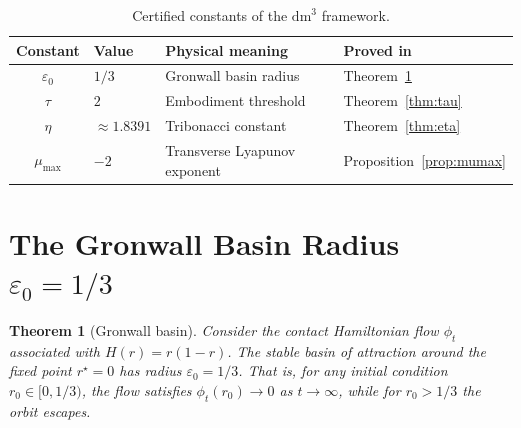 \documentclass[11pt,a4paper,openright]{book}
\theoremstyle{dm3thm}
\newtheorem{theorem}{Theorem}[chapter]
\theoremstyle{dm3def}
\newcommand{\dm}{\mathrm{dm}^3}
\newcommand{\eps}{\varepsilon_0}
\newcommand{\etaT}{\eta}   %
\newcommand{\mumax}{\mu_{\max}}
\begin{document}
\begin{table}[h]
\centering
\caption{Certified constants of the $\dm$ framework.}
\label{tab:constants}
\begin{tabular}{clll}
\toprule
Constant & Value & Physical meaning & Proved in \\
\midrule
$\eps$ & $1/3$ & Gronwall basin radius & Theorem~\ref{thm:eps}\\
$\tau$ & $2$ & Embodiment threshold & Theorem~\ref{thm:tau}\\
$\etaT$ & $\approx 1.8391$ & Tribonacci constant & Theorem~\ref{thm:eta}\\
$\mumax$ & $-2$ & Transverse Lyapunov exponent & Proposition~\ref{prop:mumax}\\
\bottomrule
\end{tabular}
\end{table}

\section{The Gronwall Basin Radius \texorpdfstring{$\eps = 1/3$}{ε₀ = 1/3}}

\begin{theorem}[Gronwall basin]\label{thm:eps}
Consider the contact Hamiltonian flow $\phi_t$ associated with
$H(r) = r(1-r)$.  The stable basin of attraction around the fixed point
$r^\star = 0$ has radius $\eps = 1/3$.  That is, for any initial condition
$r_0 \in [0, 1/3)$, the flow satisfies $\phi_t(r_0) \to 0$ as $t\to\infty$,
while for $r_0 > 1/3$ the orbit escapes.
\end{theorem}
\end{document}
